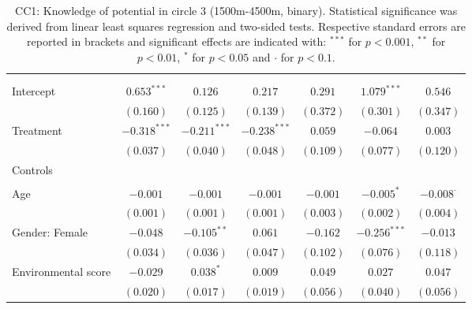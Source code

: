 \begin{center}
\begin{small}
\begin{longtable}{l@{} c@{} c@{} c@{} c@{} c@{} c@{}}
\hline
\endhead
\hline
\endfoot
\hline
\multicolumn{7}{l}{\tiny{
}}\\
\caption{CC1: Knowledge of potential in circle 3 (1500m-4500m, binary). Statistical significance was derived from linear least squares regression and two-sided tests. 
                Respective standard errors are reported in brackets and significant effects are indicated with: $^{***}$ for $p < 0.001$, $^{**}$ for $p < 0.01$, $^*$ for $p < 0.05$ and $\cdot$ for $p < 0.1$.}
\label{table:coefficients}
\endlastfoot \\
Intercept                           & $0.653^{***}$   & $0.126$        & $0.217$        & $0.291$   & $1.079^{***}$    & $0.546$          \\
                                    & $(0.160)$       & $(0.125)$      & $(0.139)$      & $(0.372)$ & $(0.301)$        & $(0.347)$        \\
Treatment                           & $-0.318^{***}$  & $-0.211^{***}$ & $-0.238^{***}$ & $0.059$   & $-0.064$         & $0.003$          \\
                                    & $(0.037)$       & $(0.040)$      & $(0.048)$      & $(0.109)$ & $(0.077)$        & $(0.120)$        \\
Controls                            &                 &                &                &           &                  &                  \\
                                    &                 &                &                &           &                  &                  \\
\quad Age                           & $-0.001$        & $-0.001$       & $-0.001$       & $-0.001$  & $-0.005^{*}$     & $-0.008^{\cdot}$ \\
                                    & $(0.001)$       & $(0.001)$      & $(0.001)$      & $(0.003)$ & $(0.002)$        & $(0.004)$        \\
\quad Gender: Female                & $-0.048$        & $-0.105^{**}$  & $0.061$        & $-0.162$  & $-0.256^{***}$   & $-0.013$         \\
                                    & $(0.034)$       & $(0.036)$      & $(0.047)$      & $(0.102)$ & $(0.076)$        & $(0.118)$        \\
\quad Environmental score           & $-0.029$        & $0.038^{*}$    & $0.009$        & $0.049$   & $0.027$          & $0.047$          \\
                                    & $(0.020)$       & $(0.017)$      & $(0.019)$      & $(0.056)$ & $(0.040)$        & $(0.056)$        \\

\end{longtable}
\end{small}
\end{center}
